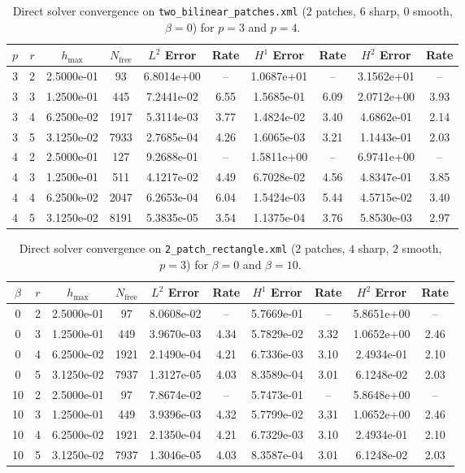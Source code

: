 \documentclass[11pt,a4paper]{article}
\begin{document}
\begin{table}[htbp]
\centering
\caption{Direct solver convergence on \texttt{two\_bilinear\_patches.xml} ($2$ patches, $6$ sharp, $0$ smooth, $\beta=0$) for $p=3$ and $p=4$.}
\label{tab:conv_bilinear}
\small
\begin{tabular}{cccccccccc}
\toprule
$p$ & $r$ & $h_{\max}$ & $N_{\mathrm{free}}$ & $L^2$ Error & Rate & $H^1$ Error & Rate & $H^2$ Error & Rate \\
\midrule
3 & 2 & 2.5000e-01 & 93   & 6.8014e+00 & --   & 1.0687e+01 & --   & 3.1562e+01 & --   \\
3 & 3 & 1.2500e-01 & 445  & 7.2441e-02 & 6.55 & 1.5685e-01 & 6.09 & 2.0712e+00 & 3.93 \\
3 & 4 & 6.2500e-02 & 1917 & 5.3114e-03 & 3.77 & 1.4824e-02 & 3.40 & 4.6862e-01 & 2.14 \\
3 & 5 & 3.1250e-02 & 7933 & 2.7685e-04 & 4.26 & 1.6065e-03 & 3.21 & 1.1443e-01 & 2.03 \\
\midrule
4 & 2 & 2.5000e-01 & 127  & 9.2688e-01 & --   & 1.5811e+00 & --   & 6.9741e+00 & --   \\
4 & 3 & 1.2500e-01 & 511  & 4.1217e-02 & 4.49 & 6.7028e-02 & 4.56 & 4.8347e-01 & 3.85 \\
4 & 4 & 6.2500e-02 & 2047 & 6.2653e-04 & 6.04 & 1.5424e-03 & 5.44 & 4.5715e-02 & 3.40 \\
4 & 5 & 3.1250e-02 & 8191 & 5.3835e-05 & 3.54 & 1.1375e-04 & 3.76 & 5.8530e-03 & 2.97 \\
\bottomrule
\end{tabular}
\end{table}

\begin{table}[htbp]
\centering
\caption{Direct solver convergence on \texttt{2\_patch\_rectangle.xml} ($2$ patches, $4$ sharp, $2$ smooth, $p=3$) for $\beta=0$ and $\beta=10$.}
\label{tab:conv_rect}
\small
\begin{tabular}{cccccccccc}
\toprule
$\beta$ & $r$ & $h_{\max}$ & $N_{\mathrm{free}}$ & $L^2$ Error & Rate & $H^1$ Error & Rate & $H^2$ Error & Rate \\
\midrule
0  & 2 & 2.5000e-01 & 97   & 8.0608e-02 & --   & 5.7669e-01 & --   & 5.8651e+00 & --   \\
0  & 3 & 1.2500e-01 & 449  & 3.9670e-03 & 4.34 & 5.7829e-02 & 3.32 & 1.0652e+00 & 2.46 \\
0  & 4 & 6.2500e-02 & 1921 & 2.1490e-04 & 4.21 & 6.7336e-03 & 3.10 & 2.4934e-01 & 2.10 \\
0  & 5 & 3.1250e-02 & 7937 & 1.3127e-05 & 4.03 & 8.3589e-04 & 3.01 & 6.1248e-02 & 2.03 \\
\midrule
10 & 2 & 2.5000e-01 & 97   & 7.8674e-02 & --   & 5.7473e-01 & --   & 5.8648e+00 & --   \\
10 & 3 & 1.2500e-01 & 449  & 3.9396e-03 & 4.32 & 5.7799e-02 & 3.31 & 1.0652e+00 & 2.46 \\
10 & 4 & 6.2500e-02 & 1921 & 2.1350e-04 & 4.21 & 6.7329e-03 & 3.10 & 2.4934e-01 & 2.10 \\
10 & 5 & 3.1250e-02 & 7937 & 1.3046e-05 & 4.03 & 8.3587e-04 & 3.01 & 6.1248e-02 & 2.03 \\
\bottomrule
\end{tabular}
\end{table}
\end{document}
